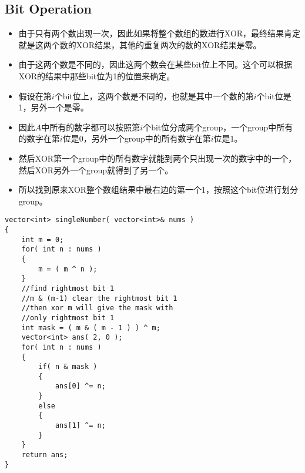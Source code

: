 \subsection{Bit Operation}
\begin{itemize}
\item 由于只有两个数出现一次，因此如果将整个数组的数进行XOR，最终结果肯定就是这两个数的XOR结果，其他的重复两次的数的XOR结果是零。
\item 由于这两个数是不同的，因此这两个数会在某些bit位上不同。这个可以根据XOR的结果中那些bit位为1的位置来确定。
\item 假设在第$i$个bit位上，这两个数是不同的，也就是其中一个数的第$i$个bit位是1，另外一个是零。
\item 因此$A$中所有的数字都可以按照第$i$个bit位分成两个group，一个group中所有的数字在第$i$位是0，另外一个group中的所有数字在第$i$位是1。
\item 然后XOR第一个group中的所有数字就能到两个只出现一次的数字中的一个，然后XOR另外一个group就得到了另一个。
\item 所以找到原来XOR整个数组结果中最右边的第一个1，按照这个bit位进行划分group。\setcounter{lstlisting}{0}
\end{itemize}
\begin{lstlisting}[style=customc, caption={XOR}]
vector<int> singleNumber( vector<int>& nums )
{
    int m = 0;
    for( int n : nums )
    {
        m = ( m ^ n );
    }
    //find rightmost bit 1
    //m & (m-1) clear the rightmost bit 1
    //then xor m will give the mask with
    //only rightmost bit 1
    int mask = ( m & ( m - 1 ) ) ^ m;
    vector<int> ans( 2, 0 );
    for( int n : nums )
    {
        if( n & mask )
        {
            ans[0] ^= n;
        }
        else
        {
            ans[1] ^= n;
        }
    }
    return ans;
}
\end{lstlisting}

